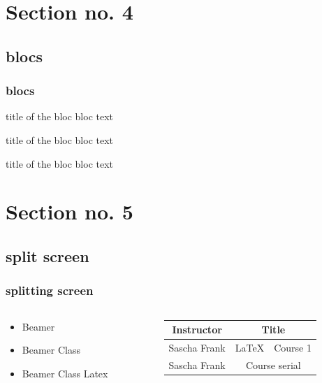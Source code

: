 \documentclass{beamer}
\begin{document}
\section{Section no. 4}
\subsection{blocs}
\begin{frame}\frametitle{blocs}

\begin{block}{title of the bloc}
bloc text
\end{block}

\begin{exampleblock}{title of the bloc}
bloc text
\end{exampleblock}


\begin{alertblock}{title of the bloc}
bloc text
\end{alertblock}
\end{frame}

\section{Section no. 5}
\subsection{split screen}

\begin{frame}\frametitle{splitting screen}
\begin{columns}
\begin{column}{5cm}
\begin{itemize}
\item Beamer 
\item Beamer Class 
\item Beamer Class Latex 
\end{itemize}
\end{column}
\begin{column}{5cm}
\begin{tabular}{|c|c|}
\hline
\textbf{Instructor} & \textbf{Title} \\
\hline
Sascha Frank &  \LaTeX\ \ Course 1 \\
\hline
Sascha Frank &  Course serial  \\
\hline
\end{tabular}
\end{column}
\end{columns}
\end{frame}
\end{document}

